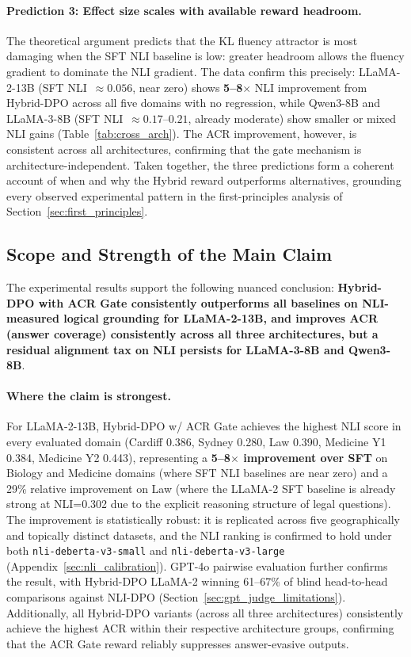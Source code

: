 \paragraph{Prediction 3: Effect size scales with available reward headroom.}
The theoretical argument predicts that the KL fluency attractor is most damaging when the SFT NLI baseline is low: greater headroom allows the fluency gradient to dominate the NLI gradient. The data confirm this precisely: LLaMA-2-13B (SFT NLI~$\approx 0.056$, near zero) shows \textbf{5--8$\times$} NLI improvement from Hybrid-DPO across all five domains with no regression, while Qwen3-8B and LLaMA-3-8B (SFT NLI~$\approx 0.17$--$0.21$, already moderate) show smaller or mixed NLI gains (Table~\ref{tab:cross_arch}). The ACR improvement, however, is consistent across all architectures, confirming that the gate mechanism is architecture-independent. Taken together, the three predictions form a coherent account of when and why the Hybrid reward outperforms alternatives, grounding every observed experimental pattern in the first-principles analysis of Section~\ref{sec:first_principles}.

\subsection{Scope and Strength of the Main Claim}
\label{sec:claim_scope}

The experimental results support the following nuanced conclusion: \textbf{Hybrid-DPO with ACR Gate consistently outperforms all baselines on NLI-measured logical grounding for LLaMA-2-13B, and improves ACR (answer coverage) consistently across all three architectures, but a residual alignment tax on NLI persists for LLaMA-3-8B and Qwen3-8B}.

\paragraph{Where the claim is strongest.}
For LLaMA-2-13B, Hybrid-DPO w/ ACR Gate achieves the highest NLI score in every evaluated domain (Cardiff 0.386, Sydney 0.280, Law 0.390, Medicine Y1 0.384, Medicine Y2 0.443), representing a \textbf{5--8$\times$ improvement over SFT} on Biology and Medicine domains (where SFT NLI baselines are near zero) and a 29\% relative improvement on Law (where the LLaMA-2 SFT baseline is already strong at NLI=0.302 due to the explicit reasoning structure of legal questions).
The improvement is statistically robust: it is replicated across five geographically and topically distinct datasets, and the NLI ranking is confirmed to hold under both \texttt{nli-deberta-v3-small} and \texttt{nli-deberta-v3-large} (Appendix~\ref{sec:nli_calibration}).
GPT-4o pairwise evaluation further confirms the result, with Hybrid-DPO LLaMA-2 winning 61--67\% of blind head-to-head comparisons against NLI-DPO (Section~\ref{sec:gpt_judge_limitations}).
Additionally, all Hybrid-DPO variants (across all three architectures) consistently achieve the highest ACR within their respective architecture groups, confirming that the ACR Gate reward reliably suppresses answer-evasive outputs.

